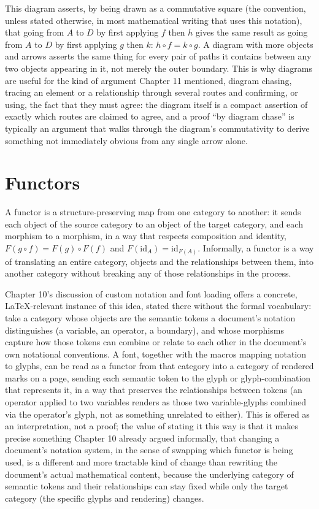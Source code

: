 This diagram asserts, by being drawn as a commutative square (the convention, unless stated otherwise, in most mathematical writing that uses this notation), that going from \(A\) to \(D\) by first applying \(f\) then \(h\) gives the same result as going from \(A\) to \(D\) by first applying \(g\) then \(k\): \(h \circ f = k \circ g\). A diagram with more objects and arrows asserts the same thing for every pair of paths it contains between any two objects appearing in it, not merely the outer boundary. This is why diagrams are useful for the kind of argument Chapter 11 mentioned, diagram chasing, tracing an element or a relationship through several routes and confirming, or using, the fact that they must agree: the diagram itself is a compact assertion of exactly which routes are claimed to agree, and a proof ``by diagram chase'' is typically an argument that walks through the diagram's commutativity to derive something not immediately obvious from any single arrow alone.

\hypertarget{b.4-functors}{%
\section{Functors}\label{b.4-functors}}

A functor is a structure-preserving map from one category to another: it sends each object of the source category to an object of the target category, and each morphism to a morphism, in a way that respects composition and identity, \(F(g \circ f) = F(g) \circ F(f)\) and \(F(\mathrm{id}_A) = \mathrm{id}_{F(A)}\). Informally, a functor is a way of translating an entire category, objects and the relationships between them, into another category without breaking any of those relationships in the process.

Chapter 10's discussion of custom notation and font loading offers a concrete, LaTeX-relevant instance of this idea, stated there without the formal vocabulary: take a category whose objects are the semantic tokens a document's notation distinguishes (a variable, an operator, a boundary), and whose morphisms capture how those tokens can combine or relate to each other in the document's own notational conventions. A font, together with the macros mapping notation to glyphs, can be read as a functor from that category into a category of rendered marks on a page, sending each semantic token to the glyph or glyph-combination that represents it, in a way that preserves the relationships between tokens (an operator applied to two variables renders as those two variable-glyphs combined via the operator's glyph, not as something unrelated to either). This is offered as an interpretation, not a proof; the value of stating it this way is that it makes precise something Chapter 10 already argued informally, that changing a document's notation system, in the sense of swapping which functor is being used, is a different and more tractable kind of change than rewriting the document's actual mathematical content, because the underlying category of semantic tokens and their relationships can stay fixed while only the target category (the specific glyphs and rendering) changes.


